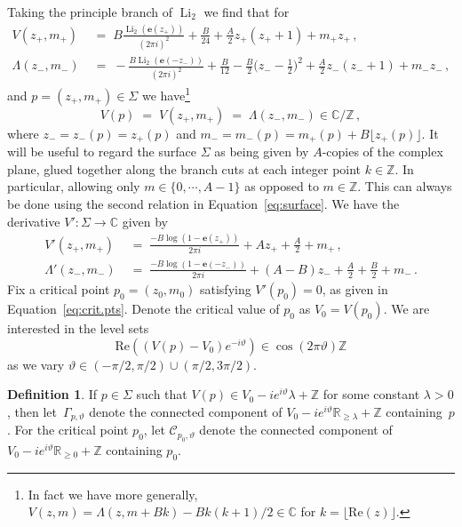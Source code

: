 \documentclass[12pt,reqno]{amsart}
\theoremstyle{definition}
\newtheorem{definition}[theorem]{Definition}
\def\BZ{\mathbb Z}
\def\BR{\mathbb R}
\def\BC{\mathbb C}
\def\Re{\mathrm{Re}}
\def\be{\begin{equation}}
\def\ee{\end{equation}}
\def\e{\mathbf e}
\renewcommand{\=}{\;=\;}
\newcommand{\Li}{\operatorname{Li}}
\begin{document}
\noindent Taking the principle branch of $\Li_2$ we find that for
\be\label{eq:V_Lambda}
\begin{aligned}
  V(z_+,m_+)
  &\=
  B\frac{\Li_{2}(\e(z_+))}{(2\pi i)^2}+\frac{B}{24}+\frac{A}{2}z_+(z_++1)+m_+z_+\,,\\
  \Lambda(z_-,m_-)
  &\=
  -\frac{B\Li_{2}(\e(-z_-))}{(2\pi i)^2}
  +\frac{B}{12}
  -\frac{B}{2}\Big(z_--\frac{1}{2}\Big)^2
  +\frac{A}{2}z_-(z_-+1)+m_-z_-\,,
\end{aligned}
\ee
and $p=(z_+,m_+)\in\Sigma$ we have\footnote{In fact we have more generally, $V(z,m)=\Lambda(z,m+Bk)-Bk(k+1)/2\in\BC$ for $k=\lfloor \Re(z)\rfloor$.}
\be
  V(p)\=V(z_+,m_+)\=\Lambda(z_-,m_-)\in\BC/\BZ\,,
\ee
where $z_-=z_-(p)=z_+(p)$ and $m_-=m_-(p)=m_+(p)+B\lfloor z_+(p)\rfloor$.
It will be useful to regard the surface $\Sigma$ as being given by $A$-copies of the complex plane, glued together along the branch cuts at each integer point $k\in\BZ$. In particular, allowing only $m\in\{0,\cdots,A-1\}$ as opposed to $m\in\BZ$. This can always be done using the second relation in Equation~\eqref{eq:surface}. We have the derivative $V':\Sigma\rightarrow\BC$ given by
\be\label{eq:tangent}
\begin{aligned}
  V'(z_+,m_+)
  &\=
  \frac{-B\log(1-\e(z_+))}{2\pi i}+Az_++\frac{A}{2}+m_+\,,\\
  \Lambda'(z_-,m_-)
  &\=
  \frac{-B\log(1-\e(-z_-))}{2\pi i}+(A-B)z_-+\frac{A}{2}+\frac{B}{2}+m_-\,.
\end{aligned}
\ee
Fix a critical point $p_0=(z_0,m_0)$ satisfying $V'(p_0)=0$, as given in Equation~\eqref{eq:crit.pts}. Denote the critical value of $p_0$ as $V_{0}=V(p_0)$. We are interested in the level sets 
\be
\Re((V(p)-V_0) e^{-i\vartheta})\in\cos(2\pi\vartheta)\BZ
\ee
as we vary $\vartheta\in(-\pi/2,\pi/2)\cup(\pi/2,3\pi/2)$. 
\begin{definition}\label{def:GGamma_p}
If $p\in\Sigma$ such that $V(p)\in V_0-i e^{i\vartheta}\lambda+\BZ$ for some constant $\lambda>0$, then let~$\Gamma_{p,\vartheta}$ denote the connected component of $V_0-i e^{i\vartheta}\BR_{\geq\lambda}+\BZ$ containing~$p$. For the critical point $p_0$, let $\mathcal{C}_{p_0,\vartheta}$ denote the connected component of $V_0-i e^{i\vartheta}\BR_{\geq0}+\BZ$ containing $p_0$.
\end{definition}
\end{document}
